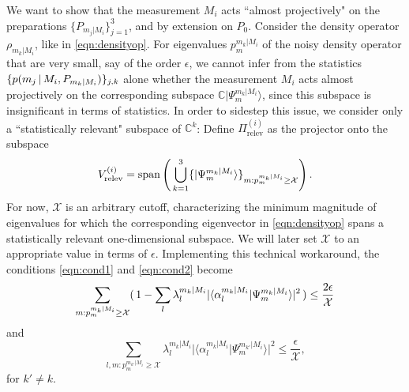 We want to show that the measurement $M_i$ acts ``almost projectively" on the preparations $\{P_{m_j\vert M_i}\}_{j=1}^3$, and by extension on $P_0$. Consider the density operator $\rho_{m_k\vert M_i}$, like in \ref{eqn:densityop}. For eigenvalues $p_m^{m_k\vert M_i}$ of the noisy density operator that are very small, say of the order $\epsilon$, we cannot infer from the statistics $\{p(m_j\thinspace\vert\thinspace M_i, P_{m_k\vert M_i})\}_{j,k}$ alone whether the measurement $M_i$ acts almost projectively on the corresponding subspace $\mathbb{C}\vert \Psi_m^{m_k\vert M_i}\rangle$, since this subspace is insignificant in terms of statistics. In order to sidestep this issue, we consider only a ``statistically relevant" subspace of $\mathbb{C}^k$:
Define $\Pi_{\text{relev}}^{(i)}$ as the projector onto the subspace 
\begin{equation}
\label{eqn:relevsubspace}
V_{\text{relev}}^{(i)}=\operatorname{span}\left(\thinspace\bigcup_{k=1}^3\{\vert \Psi_m^{m_k\vert M_i}\rangle\}_{m:p_m^{m_k\vert M_i}\geq\mathcal{X}}\right).
\end{equation}
For now, $\mathcal{X}$ is an arbitrary cutoff, characterizing the minimum magnitude of eigenvalues for which the corresponding eigenvector in \ref{eqn:densityop} spans a statistically relevant one-dimensional subspace. We will later set $\mathcal{X}$ to an appropriate value in terms of $\epsilon$. Implementing this technical workaround, the conditions \ref{eqn:cond1} and \ref{eqn:cond2} become
\begin{equation}
\label{eqn:cond1new}
\sum_{m:p_m^{m_k\vert M_i}\geq \mathcal{X}} (\thinspace 1-\sum_l \lambda_l^{m_k\vert M_i} \vert \langle \alpha_l^{m_k\vert M_i}\vert \Psi_m^{m_k\vert M_i} \rangle \vert^2\thinspace)\leq \frac{2\epsilon}{\mathcal{X}}
\end{equation}
and
\begin{equation}
\label{eqn:cond2new}
\sum_{l,m:p_m^{m_{k'}\vert M_i}\geq \mathcal{X}} \lambda_l^{m_k\vert M_i} \vert \langle \alpha_l^{m_k\vert M_i}\vert \Psi_m^{m_{k'}\vert M_i} \rangle \vert^2\leq \frac{\epsilon}{\mathcal{X}},
\end{equation}
for $k'\neq k$.

